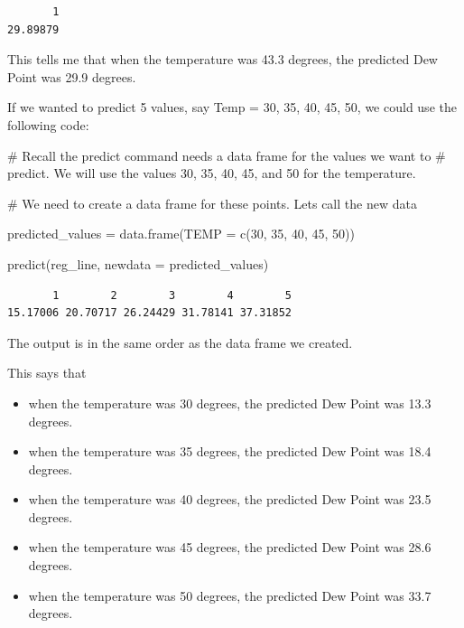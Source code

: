 \documentclass[
  letterpaper,
  DIV=11,
  numbers=noendperiod]{scrreprt}
\newenvironment{Shaded}{\begin{snugshade}}{\end{snugshade}}
\newcommand{\AttributeTok}[1]{\textcolor[rgb]{0.40,0.45,0.13}{#1}}
\newcommand{\CommentTok}[1]{\textcolor[rgb]{0.37,0.37,0.37}{#1}}
\newcommand{\DecValTok}[1]{\textcolor[rgb]{0.68,0.00,0.00}{#1}}
\newcommand{\FunctionTok}[1]{\textcolor[rgb]{0.28,0.35,0.67}{#1}}
\newcommand{\NormalTok}[1]{\textcolor[rgb]{0.00,0.23,0.31}{#1}}
\newcommand{\OtherTok}[1]{\textcolor[rgb]{0.00,0.23,0.31}{#1}}
\providecommand{\tightlist}{%
  \setlength{\itemsep}{0pt}\setlength{\parskip}{0pt}}\usepackage{longtable,booktabs,array}
\begin{document}
\begin{verbatim}
       1 
29.89879 
\end{verbatim}

This tells me that when the temperature was 43.3 degrees, the predicted
Dew Point was 29.9 degrees.

If we wanted to predict 5 values, say Temp = 30, 35, 40, 45, 50, we
could use the following code:

\begin{Shaded}
\begin{Highlighting}[]
\CommentTok{\# Recall the predict command needs a data frame for the values we want to}
\CommentTok{\# predict. We will use the values 30, 35, 40, 45, and 50 for the temperature.}

\CommentTok{\# We need to create a data frame for these points. Let\textquotesingle{}s call the new data}

\NormalTok{predicted\_values }\OtherTok{=} \FunctionTok{data.frame}\NormalTok{(}\AttributeTok{TEMP =} \FunctionTok{c}\NormalTok{(}\DecValTok{30}\NormalTok{, }\DecValTok{35}\NormalTok{, }\DecValTok{40}\NormalTok{, }\DecValTok{45}\NormalTok{, }\DecValTok{50}\NormalTok{))}

\FunctionTok{predict}\NormalTok{(reg\_line, }\AttributeTok{newdata =}\NormalTok{ predicted\_values)}
\end{Highlighting}
\end{Shaded}

\begin{verbatim}
       1        2        3        4        5 
15.17006 20.70717 26.24429 31.78141 37.31852 
\end{verbatim}

The output is in the same order as the data frame we created.

This says that

\begin{itemize}
\tightlist
\item
  when the temperature was 30 degrees, the predicted Dew Point was 13.3
  degrees.
\item
  when the temperature was 35 degrees, the predicted Dew Point was 18.4
  degrees.
\item
  when the temperature was 40 degrees, the predicted Dew Point was 23.5
  degrees.
\item
  when the temperature was 45 degrees, the predicted Dew Point was 28.6
  degrees.
\item
  when the temperature was 50 degrees, the predicted Dew Point was 33.7
  degrees.
\end{itemize}
\end{document}

